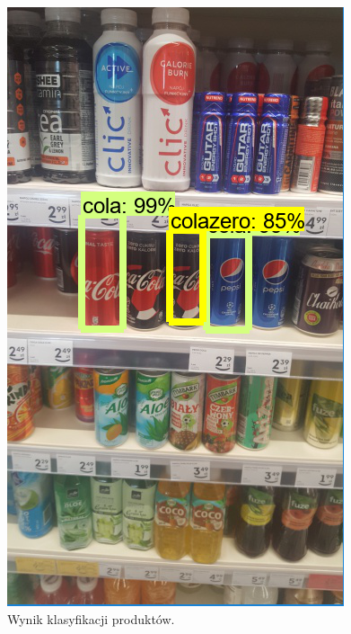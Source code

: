 {{\begin{figure}[htb]
	\caption{Wynik klasyfikacji produktów.}
	\label{afterClasification}
	\noindent\begin{minipage}
		{0.43\textwidth}\raggedleft		\includegraphics[width=\linewidth]{"images/detection_sample_result"}
	\end{minipage}
	\begin{minipage}{0.57\textwidth}

\end{minipage}
\end{figure}}}
